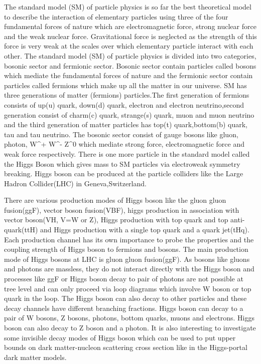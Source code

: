 \documentclass[final,3p]{CSP}
\begin{document}
The standard model (SM) of particle physics is so far the best theoretical model to describe the interaction of elementary 
particles using three of the four fundamental forces of nature which are electromagnetic force, strong nuclear force and the weak
nuclear force. Gravitational force is neglected as the strength of this force is very weak at the scales over which elementary 
particle interact with each other. The standard model (SM) of particle physics is divided into two categories, bosonic sector 
and fermionic sector. Bosonic sector contain particles called bosons which mediate the fundamental forces of nature and the
fermionic sector contain particles called fermions which make up all the matter in our universe. SM has three generations of 
matter (fermions) particles.The first generation of fermions consists of up(u) quark, down(d) quark, electron and electron neutrino,second generation consist of charm(c) quark, strange(s) quark, muon and muon neutrino and the third generation of matter 
particles has top(t) quark,bottom(b) quark, tau and tau neutrino. The bosonic sector consist of gauge bosons like gluon, photon, 
W^+ W^- Z^0 which mediate strong force, electromagnetic force and weak force respectively. There is one more particle in the 
standard model called the Higgs Boson which gives mass to SM particles via electroweak symmetry breaking. Higgs boson can be 
produced at the particle colliders like the Large Hadron Collider(LHC) in Geneva,Switzerland. 

There are various production modes of Higgs boson like the gluon gluon  fusion(ggF), vector boson fusion(VBF), higgs production 
in association with vector boson(VH, V=W or Z), Higgs production with top quark and top anti-quark(ttH) and Higgs production with 
a single top quark and a quark jet(tHq). Each production channel has its own importance to probe the properties and the coupling 
strength of Higgs boson to fermions and bosons. The main production mode of Higgs bosons at LHC is gluon gluon fusion(ggF). As 
bosons like gluons and photons are massless, they do not interact directly with the Higgs boson and processes like ggF or Higgs 
boson decay to pair of photons are not possible at tree level and can only proceed via loop diagrams which involve W boson or top 
quark in the loop. The Higgs boson can also decay to other particles and these decay channels have different branching fractions. 
Higgs boson can decay to a pair of W bosons, Z bosons, photons, bottom quarks, muons and electrons. Higgs boson can also decay to 
Z boson and a photon. It is also interesting to investigate some invisible decay modes of Higgs boson which can be used to put 
upper bounds on dark matter-nucleon scattering cross section like in the Higgs-portal dark matter models. 
\end{document}
